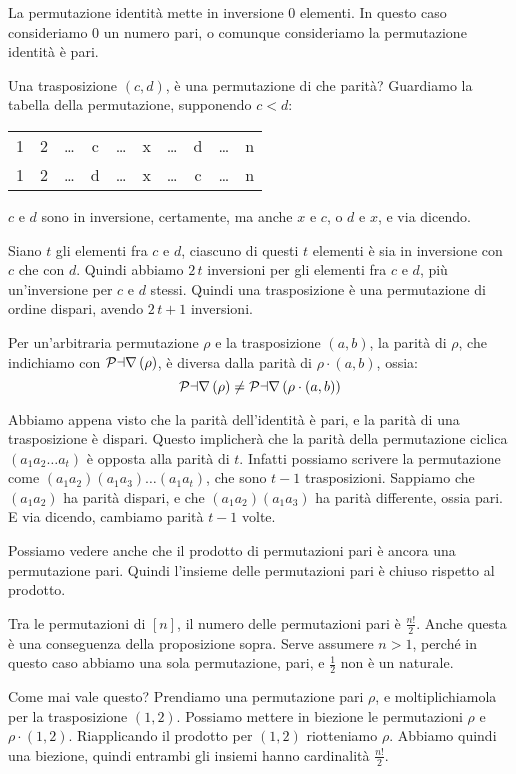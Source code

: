 La permutazione identit\`a mette in inversione 0 elementi.
In questo caso consideriamo 0 un numero pari, o comunque consideriamo la permutazione identit\`a \`e pari.

Una trasposizione $(c,d)$, \`e una permutazione di che parit\`a?
Guardiamo la tabella della permutazione, supponendo $c < d$:

\begin{tabular}{*{10}{c}}
	1 & 2 & \dots & c & \dots & x & \dots & d & \dots & n \\
	1 & 2 & \dots & d & \dots & x & \dots & c & \dots & n 
\end{tabular}

$c$ e $d$ sono in inversione, certamente, ma anche $x$ e $c$, o $d$ e $x$, e via dicendo.

Siano $t$ gli elementi fra $c$ e $d$, ciascuno di questi $t$ elementi \`e sia in inversione con $c$ che con $d$.
Quindi abbiamo $2 \, t$ inversioni per gli elementi fra $c$ e $d$, pi\`u un'inversione per $c$ e $d$ stessi.
Quindi una trasposizione \`e una permutazione di ordine dispari, avendo $2 \, t + 1$ inversioni.

\begin{prop}
	Per un'arbitraria permutazione $\rho$ e la trasposizione $(a,b)$, la parit\`a di $\rho$, che indichiamo con $\mathcal{Par}\left( { \rho } \right)$, \`e diversa dalla parit\`a di $\rho \cdot (a,b)$, ossia:
	\[
		\mathcal{Par}\left( { \rho } \right) \neq \mathcal{Par}\left( { \rho \cdot (a,b) } \right)
	\]
\end{prop}
Abbiamo appena visto che la parit\`a dell'identit\`a \`e pari, e la parit\`a di una trasposizione \`e dispari.
Questo implicher\`a che la parit\`a della permutazione ciclica $(a_1 a_2 \dots a_t)$ \`e opposta alla parit\`a di $t$.
Infatti possiamo scrivere la permutazione come $(a_1 a_2) (a_1 a_3) \dots (a_1 a_t)$, che sono $t-1$ trasposizioni.
Sappiamo che $(a_1 a_2)$ ha parit\`a dispari, e che $(a_1 a_2) (a_1 a_3)$ ha parit\`a differente, ossia pari.
E via dicendo, cambiamo parit\`a $t-1$ volte.

Possiamo vedere anche che il prodotto di permutazioni pari \`e ancora una permutazione pari.
Quindi l'insieme delle permutazioni pari \`e chiuso rispetto al prodotto.

Tra le permutazioni di $[n]$, il numero delle permutazioni pari \`e $\frac{n!}{2}$.
Anche questa \`e una conseguenza della proposizione sopra.
Serve assumere $n > 1$, perch\'e in questo caso abbiamo una sola permutazione, pari, e $\frac{1}{2}$ non \`e un naturale.

Come mai vale questo? 
Prendiamo una permutazione pari $\rho$, e moltiplichiamola per la trasposizione $(1,2)$.
Possiamo mettere in biezione le permutazioni $\rho$ e $\rho \cdot (1,2)$.
Riapplicando il prodotto per $(1,2)$ riotteniamo $\rho$.
Abbiamo quindi una biezione, quindi entrambi gli insiemi hanno cardinalit\`a $\frac{n!}{2}$.

